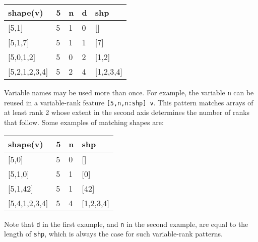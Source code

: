 \begin{table}[ht!]
\ttfamily
\begin{tabular}{lllll}\hline
    shape(v)             & 5 & n & d & shp       \\\hline
    \text{}[5,1]         & 5 & 1 & 0 & []        \\
    \text{}[5,1,7]       & 5 & 1 & 1 & [7]       \\
    \text{}[5,0,1,2]     & 5 & 0 & 2 & [1,2]     \\
    \text{}[5,2,1,2,3,4] & 5 & 2 & 4 & [1,2,3,4] \\\hline
\end{tabular}
\end{table}

\noindent
Variable names may be used more than once.
For example, the variable \texttt{n} can be reused in a variable-rank feature \texttt{[5,n,n:shp]}~\texttt{v}.
This pattern matches arrays of at least rank 2 whose extent in the second axis determines the number of ranks that follow.
Some examples of matching shapes are:

\begin{table}[ht!]
\ttfamily
\begin{tabular}{llll}\hline
    shape(v)             & 5 & n & shp       \\\hline
    \text{}[5,0]         & 5 & 0 & []        \\
    \text{}[5,1,0]       & 5 & 1 & [0]       \\
    \text{}[5,1,42]      & 5 & 1 & [42]      \\
    \text{}[5,4,1,2,3,4] & 5 & 4 & [1,2,3,4] \\\hline
\end{tabular}
\end{table}

\noindent
Note that \texttt{d} in the first example, and \texttt{n} in the second example, are equal to the length of \texttt{shp}, which is always the case for such variable-rank patterns.
